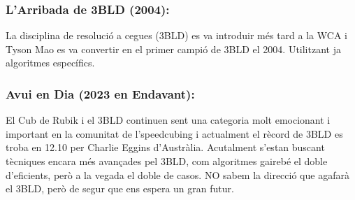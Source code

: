 \subsubsection{L'Arribada de 3BLD (2004):}

La disciplina de resolució a cegues (3BLD) es va introduir més tard a la WCA i Tyson Mao es va convertir en el primer campió de 3BLD el 2004. Utilitzant ja algoritmes específics.

\subsubsection{Avui en Dia (2023 en Endavant):}

El Cub de Rubik i el 3BLD continuen sent una categoria molt emocionant i important en la comunitat de l'speedcubing i actualment el rècord de 3BLD es troba en 12.10 per Charlie Eggins d'Austràlia. Acutalment s'estan buscant tècniques encara més avançades pel 3BLD, com algoritmes gairebé el doble d'eficients, però a la vegada el doble de casos. NO sabem la direcció que agafarà el 3BLD, però de segur que ens espera un gran futur.




